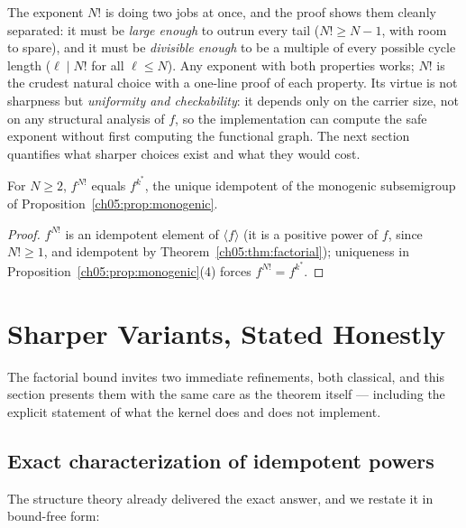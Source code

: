 \begin{remark}
\label{ch05:rem:whyfactorial}
The exponent $N!$ is doing two jobs at once, and the proof shows them
cleanly separated: it must be \emph{large enough} to outrun every tail
($N! \ge N - 1$, with room to spare), and it must be \emph{divisible
enough} to be a multiple of every possible cycle length
($\ell \mid N!$ for all $\ell \le N$). Any exponent with both properties
works; $N!$ is the crudest natural choice with a one-line proof of each
property. Its virtue is not sharpness but \emph{uniformity and
checkability}: it depends only on the carrier size, not on any structural
analysis of $f$, so the implementation can compute the safe exponent
without first computing the functional graph. The next section quantifies
what sharper choices exist and what they would cost.
\end{remark}

\begin{corollary}
\label{ch05:cor:whichidem}
For $N \ge 2$, $f^{N!}$ equals $f^{k^{*}}$, the unique idempotent of the
monogenic subsemigroup of Proposition~\ref{ch05:prop:monogenic}.
\end{corollary}

\begin{proof}
$f^{N!}$ is an idempotent element of $\langle f \rangle$ (it is a positive
power of $f$, since $N! \ge 1$, and idempotent by
Theorem~\ref{ch05:thm:factorial}); uniqueness in
Proposition~\ref{ch05:prop:monogenic}(4) forces
$f^{N!} = f^{k^{*}}$.
\end{proof}

\section{Sharper Variants, Stated Honestly}
\label{ch05:sec:sharper}

The factorial bound invites two immediate refinements, both classical, and
this section presents them with the same care as the theorem itself ---
including the explicit statement of what the kernel does and does not
implement.

\subsection{Exact characterization of idempotent powers}

The structure theory already delivered the exact answer, and we restate it
in bound-free form:

